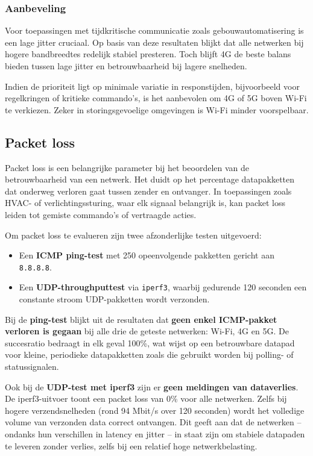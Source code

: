 \subsubsection{Aanbeveling}
Voor toepassingen met tijdkritische communicatie zoals gebouwautomatisering is een lage jitter cruciaal. Op basis van deze resultaten blijkt dat alle netwerken bij hogere bandbreedtes redelijk stabiel presteren. Toch blijft 4G de beste balans bieden tussen lage jitter en betrouwbaarheid bij lagere snelheden.

Indien de prioriteit ligt op minimale variatie in responstijden, bijvoorbeeld voor regelkringen of kritieke commando's, is het aanbevolen om 4G of 5G boven Wi-Fi te verkiezen. Zeker in storingsgevoelige omgevingen is Wi-Fi minder voorspelbaar.

\subsection{Packet loss}
Packet loss is een belangrijke parameter bij het beoordelen van de betrouwbaarheid van een netwerk. Het duidt op het percentage datapakketten dat onderweg verloren gaat tussen zender en ontvanger. In toepassingen zoals HVAC- of verlichtingssturing, waar elk signaal belangrijk is, kan packet loss leiden tot gemiste commando’s of vertraagde acties.

Om packet loss te evalueren zijn twee afzonderlijke testen uitgevoerd:
\begin{itemize}
    \item Een \textbf{ICMP ping-test} met 250 opeenvolgende pakketten gericht aan \texttt{8.8.8.8}.
    \item Een \textbf{UDP-throughputtest} via \texttt{iperf3}, waarbij gedurende 120 seconden een constante stroom UDP-pakketten wordt verzonden.
\end{itemize}

Bij de \textbf{ping-test} blijkt uit de resultaten dat \textbf{geen enkel ICMP-pakket verloren is gegaan} bij alle drie de geteste netwerken: Wi-Fi, 4G en 5G. De succesratio bedraagt in elk geval 100\%, wat wijst op een betrouwbare datapad voor kleine, periodieke datapakketten zoals die gebruikt worden bij polling- of statussignalen.

Ook bij de \textbf{UDP-test met iperf3} zijn er \textbf{geen meldingen van dataverlies}. De iperf3-uitvoer toont een packet loss van 0\% voor alle netwerken. Zelfs bij hogere verzendsnelheden (rond 94 Mbit/s over 120 seconden) wordt het volledige volume van verzonden data correct ontvangen. Dit geeft aan dat de netwerken – ondanks hun verschillen in latency en jitter – in staat zijn om stabiele datapaden te leveren zonder verlies, zelfs bij een relatief hoge netwerkbelasting.

